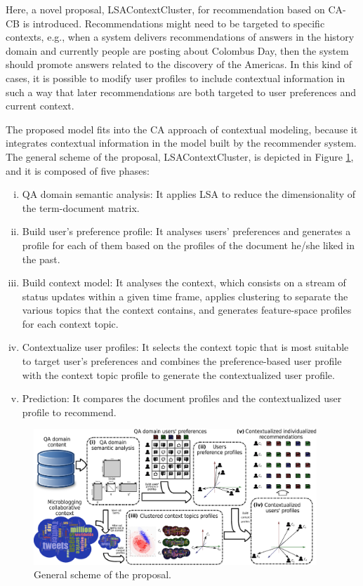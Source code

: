 \documentclass[preprint]{elsarticle}
\begin{document}
\begin{spacing}{1.5}
Here, a novel proposal, LSAContextCluster, for recommendation based on CA-CB is introduced. Recommendations might need to be targeted to specific contexts, e.g., when a system delivers recommendations of answers in the history domain and currently people are posting about Colombus Day, then the system should promote answers related to the discovery of the Americas. In this kind of cases, it is possible to modify user profiles to include contextual information in such a way that later recommendations are both targeted to user preferences and current context.

The proposed model fits into the CA approach of contextual modeling, because it integrates contextual information in the model built by the recommender system. The general scheme of the proposal, LSAContextCluster, is depicted in Figure \ref{fig:proposal-scheme}, and it is composed of five phases:
\begin{enumerate}[(i)]
	\item QA domain semantic analysis: It applies LSA to reduce the dimensionality of the term-document matrix.
	\item Build user's preference profile: It analyses users' preferences and generates a profile for each of them based on the profiles of the document he/she liked in the past.
	\item Build context model: It analyses the context, which consists on a stream of status updates within a given time frame, applies clustering to separate the various topics that the context contains, and generates feature-space profiles for each context topic.
	\item Contextualize user profiles: It selects the context topic that is most suitable to target user's preferences and combines the preference-based user profile with the context topic profile to generate the contextualized user profile.
	\item Prediction: It compares the document profiles and the contextualized user profile to recommend.
\end{enumerate}

\begin{figure}[h]
	\centering
	\includegraphics[width=0.95\textwidth]{figures/proposal-scheme-v5.eps}
	\caption{General scheme of the proposal.}
	\label{fig:proposal-scheme}
\end{figure}


\end{spacing}
\end{document}
